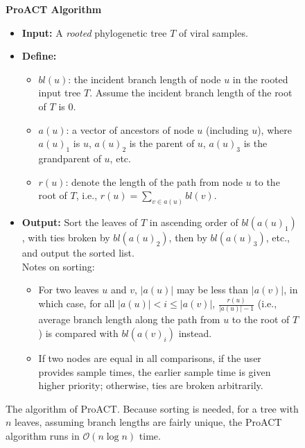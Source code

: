 \documentclass[a4paper,11pt]{article}
\newcommand{\bigO}{\mathcal{O}}
\newcommand{\D}{D}
\newcommand{\ta}[1][A]{t'}
\newcommand{\tb}{t'}
\begin{document}
\begin{figure}[hp]
    \centering
    {\bf ProACT Algorithm}
    \begin{itemize}
        \item {\bf Input:} A  {\em rooted} phylogenetic tree $T$ of viral samples. %
        \item {\bf Define:} 
        \begin{itemize}
            \item $bl(u)$: the incident branch length of node $u$  in the rooted input tree $T$.
            Assume the incident branch length of the root of $T$ is 0.
            \item $a(u)$: a vector of ancestors of node $u$ (including $u$),
where $a(u)_1$ is $u$,
$a(u)_2$ is the parent of $u$,
$a(u)_3$ is the grandparent of $u$, etc.
\item  $r(u)$: denote the length of the path from node $u$ to the root of $T$,
i.e., $r(u)=\sum_{v\in a(u)}{bl(v)}$.
        \end{itemize}
        \item 
{\bf Output:} 
Sort the leaves of $T$ in ascending order of $bl(a(u)_1)$,
with ties broken by $bl(a(u)_2)$, then by $bl(a(u)_3)$, etc., and output the sorted list.
\\
Notes on sorting: 
\begin{itemize}
    \item 
For two leaves $u$ and $v$,
$|a(u)|$ may be less than $|a(v)|$,
in which case, for all $|a(u)|<i\le|a(v)|$,
$\frac{r(u)}{|a(u)|-1}$ (i.e., average branch length along the path from $u$ to the root of $T$) is compared with $bl(a(v)_i)$ instead.
\item 
If two nodes are equal in all comparisons, if the user provides sample times, the earlier sample time is given higher priority; otherwise, ties are broken arbitrarily.
\end{itemize}
    \end{itemize}

\caption{
The algorithm of ProACT. 
Because sorting is needed, for a tree with $n$ leaves,
assuming branch lengths are fairly unique,
the ProACT algorithm runs in $\bigO(n\log n)$ time. 
 }
    \label{fig:my_label}
\end{figure}
\end{document}
